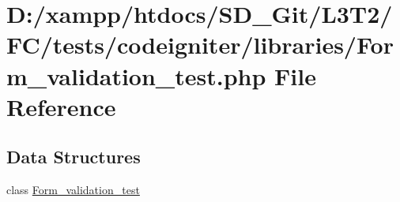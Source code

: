 \hypertarget{tests_2codeigniter_2libraries_2_form__validation__test_8php}{}\section{D\+:/xampp/htdocs/\+S\+D\+\_\+\+Git/\+L3\+T2/\+F\+C/tests/codeigniter/libraries/\+Form\+\_\+validation\+\_\+test.php File Reference}
\label{tests_2codeigniter_2libraries_2_form__validation__test_8php}
\subsection*{Data Structures}
\begin{DoxyCompactItemize}
\item 
class \hyperlink{class_form__validation__test}{Form\+\_\+validation\+\_\+test}
\end{DoxyCompactItemize}
